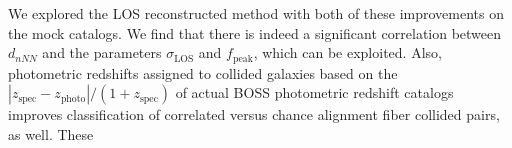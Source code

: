                                                                                                                                                                                                                                                                          We explored the LOS reconstructed method with both of these improvements 
                                                                                                                                                                                                                                                                         on the mock catalogs. We find that there is indeed a significant correlation 
                                                                                                                                                                                                                                                                         between $d_{nNN}$ and the parameters $\sigma_\mathrm{LOS}$ and 
                                                                                                                                                                                                                                                                         $f_\mathrm{peak}$, which can be exploited. Also, photometric redshifts assigned 
                                                                                                                                                                                                                                                                         to collided galaxies based on the 
                                                                                                                                                                                                                                                                         $|z_\mathrm{spec} - z_\mathrm{photo}|/(1 + z_\mathrm{spec})$
                                                                                                                                                                                                                                                                         of actual BOSS photometric redshift catalogs improves classification of 
                                                                                                                                                                                                                                                                         correlated versus chance alignment fiber collided pairs, as well. These 
